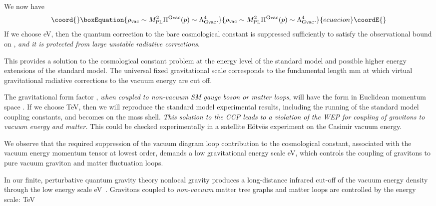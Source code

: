 \documentclass[a4paper,11pt]{article}
\begin{document}
We now have
\begin{equation}\coord{}\boxEquation{
\rho_{\rm vac}\sim M^2_{\rm PL}\Pi^{\rm {\rm Gvac}}(p)\sim\Lambda_{{\rm
Gvac}}^4.
}{
\rho_{\rm vac}\sim M^2_{\rm PL}\Pi^{\rm {\rm Gvac}}(p)\sim\Lambda_{{\rm
Gvac}}^4.
}{ecuacion}\coordE{}\end{equation} If we choose \coordHE{}
eV, then the quantum correction to the bare cosmological constant
\coordHE{} is suppressed sufficiently to satisfy the observational bound
on \myHighlight{$\lambda$}\coordHE{}, {\it and it is protected from large unstable radiative
corrections}.

This provides a solution to the
cosmological constant problem at the energy level of the standard model
and possible higher energy extensions of the standard model. The universal
fixed gravitational scale \coordHE{} corresponds to the fundamental
length \coordHE{} mm at which virtual gravitational radiative
corrections to the vacuum energy are cut off.

The gravitational form factor \coordHE{}, {\it when
coupled to non-vacuum SM gauge boson or matter loops}, will have the form
in Euclidean momentum space
\coordHE{}.
If we choose \coordHE{} TeV, then we will
reproduce the standard model experimental results, including the running
of the standard model coupling constants, and \coordHE{} becomes \coordHE{} on the mass
shell. {\it This solution to the CCP leads to a violation of the WEP for
coupling of gravitons to vacuum energy and matter.} This
could be checked experimentally in a satellite E\"otv\"os experiment on the
Casimir vacuum energy.

We observe that the required suppression of the vacuum diagram
loop contribution to the cosmological constant, associated with
the vacuum energy momentum tensor at lowest order,
demands a low gravitational energy scale \coordHE{} eV, which controls the coupling of gravitons to
pure vacuum graviton and matter fluctuation loops.

In our finite, perturbative
quantum gravity theory nonlocal gravity produces a long-distance
infrared cut-off of the vacuum energy density through the low energy
scale \coordHE{} eV~\cite{Moffat2}.
Gravitons coupled to {\it non-vacuum} matter tree graphs and matter loops
are controlled by the energy scale: \coordHE{}
TeV
\end{document}
